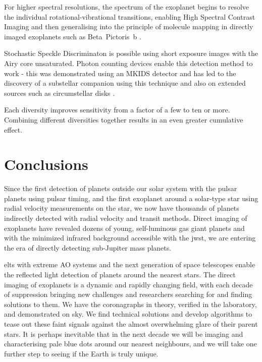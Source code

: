 \documentclass[letterpaper]{ar-1col}
\begin{document}
For higher spectral resolutions, the spectrum of the exoplanet begins to resolve the individual rotational-vibrational transitions, enabling High Spectral Contrast Imaging \citep[including the detection of HD~209458b ][]{Snellen10} and then generalising into the principle of molecule mapping in directly imaged exoplanets such as Beta~Pictoris~b \citep{Hoeijmakers18}.

Stochastic Speckle Discriminaton \citep[SSD; ][]{Gladysz09} is possible using short exposure images with the Airy core unsaturated.
%
Photon counting devices enable this detection method to work - this was demonstrated using an MKIDS detector and has led to the discovery of a substellar companion using this technique \citep{Steiger21} and also on extended sources such as circumstellar disks \citep{Steiger22}.

Each diversity improves sensitivity from a factor of a few to ten or more.
%
Combining different diversities together results in an even greater cumulative effect.

\section{Conclusions}

Since the first detection of planets outside our solar system with the pulsar planets \citep{Wolszczan92} using pulsar timing, and the first exoplanet around a solar-type star \citep[51 Peg b; ][]{Mayor95} using radial velocity measurements on the star, we now have thousands of planets indirectly detected with radial velocity and transit methods.
%
Direct imaging of exoplanets have revealed dozens of young, self-luminous gas giant planets \citep{Currie23,Chauvin24} and with the minimized infrared background accessible with the \ac{jwst}, we are entering the era of directly detecting sub-Jupiter mass planets.

\acp{elt} with extreme AO systems and the next generation of space telescopes enable the reflected light detection of planets around the nearest stars.
%
The direct imaging of exoplanets is a dynamic and rapidly changing field, with each decade of suppression bringing new challenges and researchers searching for and finding solutions to them.
%
We have the coronagraphs in theory, verified in the laboratory, and demonstrated on sky.
%
We find technical solutions and develop algorithms to tease out these faint signals against the almost overwhelming glare of their parent stars.
%
It is perhaps inevitable that in the next decade we will be imaging and characterising pale blue dots around our nearest neighbours, and we will take one further step to seeing if the Earth is truly unique.
\end{document}

